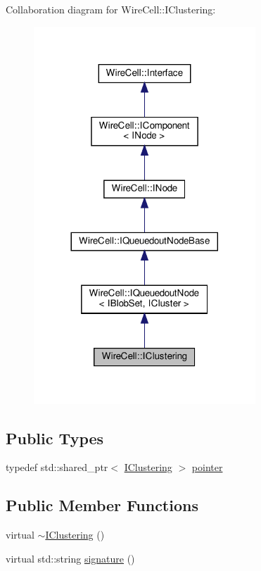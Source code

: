 Collaboration diagram for Wire\+Cell\+:\+:I\+Clustering\+:
\nopagebreak
\begin{figure}[H]
\begin{center}
\leavevmode
\includegraphics[width=236pt]{class_wire_cell_1_1_i_clustering__coll__graph}
\end{center}
\end{figure}
\subsection*{Public Types}
\begin{DoxyCompactItemize}
\item 
typedef std\+::shared\+\_\+ptr$<$ \hyperlink{class_wire_cell_1_1_i_clustering}{I\+Clustering} $>$ \hyperlink{class_wire_cell_1_1_i_clustering_a5e81dc78c5923fd10952ff7756f11e3a}{pointer}
\end{DoxyCompactItemize}
\subsection*{Public Member Functions}
\begin{DoxyCompactItemize}
\item 
virtual \hyperlink{class_wire_cell_1_1_i_clustering_a4a4cb8d47c7545352d052ba5c759373e}{$\sim$\+I\+Clustering} ()
\item 
virtual std\+::string \hyperlink{class_wire_cell_1_1_i_clustering_af2961973301a8026eb74caa78937097a}{signature} ()
\end{DoxyCompactItemize}


